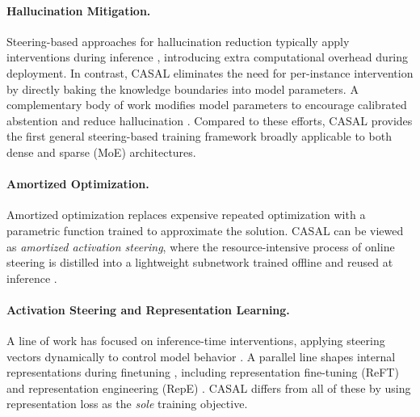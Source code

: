 \paragraph{Hallucination Mitigation.} Steering-based approaches \citep{contrastive_activation_addition, turner2024steering} for hallucination reduction typically apply interventions during inference \citep{ferrando2025entity, calibratinguncertaintylinear, li2024inferencetimeinterventionelicitingtruthful, latentshallucination}, introducing extra computational overhead during deployment. In contrast, CASAL eliminates the need for per-instance intervention by directly baking the knowledge boundaries into model parameters. A complementary body of work modifies model parameters to encourage calibrated abstention and reduce hallucination \citep{KnowledgeBoundary, linguisticcalibration, chen2025personavectors}. Compared to these efforts, CASAL provides the first general steering-based training framework broadly applicable to both dense and sparse (MoE) architectures.

\paragraph{Amortized Optimization.} Amortized optimization \citep{kingma2013auto, rezende2014stochastic, gershman2014amortized} replaces expensive repeated optimization with a parametric function trained to approximate the solution. CASAL can be viewed as \textit{amortized activation steering}, where the resource-intensive process of online steering is distilled into a lightweight subnetwork trained offline and reused at inference \citep{amos2025tutorialamortizedoptimization}.

\paragraph{Activation Steering and Representation Learning.} A line of work has focused on inference-time interventions, applying steering vectors dynamically to control model behavior \citep{calibratinguncertaintylinear, li2024inferencetimeinterventionelicitingtruthful, arditi2024refusal}. A parallel line shapes internal representations during finetuning \citep{tian2025representationengineeringvisual, yu2024mechanistic, chen2025personavectors, ablationfinetuning}, including representation fine-tuning (ReFT) \citep{wu2024reftrepresentationfinetuning} and representation engineering (RepE) \citep{zou2025representationengineering}. CASAL differs from all of these by using representation loss as the \textit{sole} training objective.

